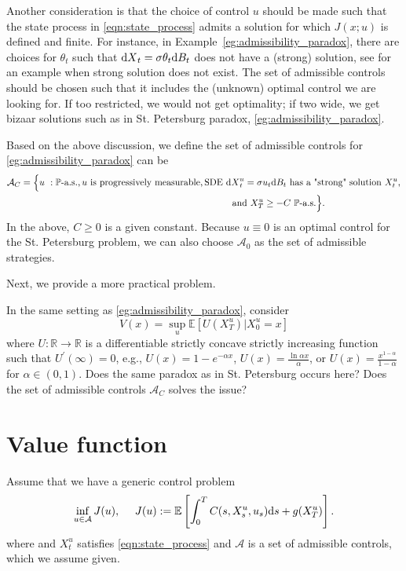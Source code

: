 \documentclass[11pt]{book}
\newcommand{\dd}{\text{\normalfont d}}
\newcommand{\ds}{\text{\normalfont d}s}
\newcommand{\dX}{\text{\normalfont d}X}
\begin{document}
Another consideration is that the choice of control $u$ should be made such that the state process in \eqref{eqn:state_process} admits a solution for which $J(x;u)$ is defined and finite. For instance, in Example~\ref{eg:admissibility_paradox}, there are choices for $\theta_t$ such that ${\dX}_t=\sigma \theta_t {\dd}B_t$ does not have a (strong) solution, see \cite{tsirel1976example} for an example when strong solution does not exist. The set of admissible controls should be chosen such that it includes the (unknown) optimal control we are looking for. If too restricted, we would not get optimality; if two wide, we get bizaar solutions such as in St. Petersburg paradox, \ref{eg:admissibility_paradox}.

Based on the above discussion, we define the set of admissible controls for \ref{eg:admissibility_paradox} can be 
\begin{equation}\label{eqn:admissible}
	\begin{split}
		\mathcal{A}_C&=\Big\{u\ :  \mathbb{P}\textrm{-a.s.}, u~\textrm{is progressively measurable}, \textrm{SDE ${\dX}^u_t=\sigma u_t {\dd}B_t$ has a "strong" solution $X_t^u$},\\ 
		&\hspace*{8cm} \textrm{and}~ X_T^u\ge -C~\mathbb{P}\textrm{-a.s.} \Big\}.
	\end{split}
\end{equation}
In the above, $C\ge0$ is a given constant. Because $u\equiv0$ is an optimal control for the St. Petersburg problem, 
we can also choose $\mathcal{A}_0$ as the set of admissible strategies.

Next, we provide a more practical problem.

\begin{ex}
    In the same setting as \ref{eg:admissibility_paradox}, consider
    \begin{equation}\label{prob:merton}
        V(x) = \sup_{u}\mathbb{E}[U(X_T^u)|X^u_0=x]
    \end{equation}
    where $U:\mathbb{R}\to\mathbb{R}$ is a differentiable strictly concave strictly increasing function such that $U^\prime(\infty)=0$, e.g., $U(x)=1-e^{-\alpha x}$, $U(x) = \frac{\ln \alpha x}{\alpha}$, or $U(x) = \frac{x^{1-\alpha}}{1-\alpha}$ for $\alpha\in(0,1)$.
    Does the same paradox as in St. Petersburg occurs here?
    Does the set of admissible controls $\mathcal{A}_C$ solves the issue?
\end{ex}


\section{Value function}
Assume that we have a generic control problem
\begin{equation}\label{problem:generic}
\inf_{u\in\mathcal{A}}J(u),~~~~J(u):=\mathbb{E}\left[\int_0^T C(s,X_s^u,u_s){{\ds}}+g(X_T^u)\right].
\end{equation}
where and $X_t^u$ satisfies \eqref{eqn:state_process} and $\mathcal{A}$ is a set of admissible controls, which we assume given.
\end{document}
